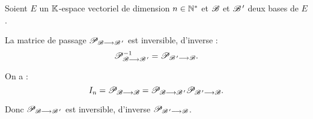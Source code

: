 \begin{prop}
Soient \(E\) un \(\K\)-espace vectoriel de dimension \(n\in\Ns\) et \(\fami{B}\) et \(\fami{B}\prim\) deux bases de \(E\).

La matrice de passage \(\pass{\fami{B}}{\fami{B}\prim}\) est inversible, d'inverse : \[\pass{\fami{B}}{\fami{B}\prim}\inv=\pass{\fami{B}\prim}{\fami{B}}.\]
\end{prop}

\begin{dem}
On a : \[I_n=\pass{\fami{B}}{\fami{B}}=\pass{\fami{B}}{\fami{B}\prim}\pass{\fami{B}\prim}{\fami{B}}.\]

Donc \(\pass{\fami{B}}{\fami{B}\prim}\) est inversible, d'inverse \(\pass{\fami{B}\prim}{\fami{B}}\).
\end{dem}